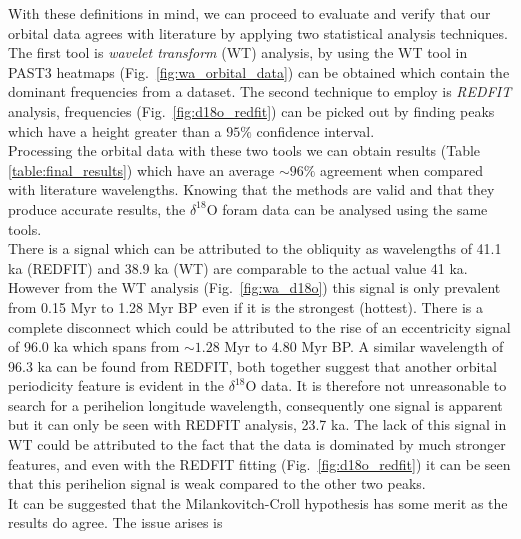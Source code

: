 \documentclass[12pt, onecolumn]{revtex4}    %
\begin{document}
With these definitions in mind, we can proceed to evaluate and verify that our orbital data agrees with literature by applying two statistical analysis techniques. The first tool is \textit{wavelet transform} (WT) analysis, by using the WT tool in PAST3 \cite{past3} heatmaps (Fig.~\ref{fig:wa_orbital_data}) can be obtained which contain the dominant frequencies from a dataset. The second technique to employ is \textit{REDFIT} analysis, frequencies (Fig.~\ref{fig:d18o_redfit}) can be picked out by finding peaks which have a height greater than a $95\%$ confidence interval. \\

Processing the orbital data with these two tools we can obtain results (Table \ref{table:final_results}) which have an average $\sim 96 \%$ agreement when compared with literature wavelengths. Knowing that the methods are valid and that they produce accurate results, the $\delta^{18}$O foram data can be analysed using the same tools. \\

There is a signal which can be attributed to the obliquity as wavelengths of 41.1 ka (REDFIT) and 38.9 ka (WT) are comparable to the actual value 41 ka. However from the WT analysis (Fig.~\ref{fig:wa_d18o}) this signal is only prevalent from 0.15 Myr to 1.28 Myr BP even if it is the strongest (hottest). There is a complete disconnect which could be attributed to the rise of an eccentricity signal of 96.0 ka which spans from $\sim 1.28$ Myr to 4.80 Myr BP. A similar wavelength of 96.3 ka can be found from REDFIT, both together suggest that another orbital periodicity feature is evident in the $\delta^{18}$O data. It is therefore not unreasonable to search for a perihelion longitude wavelength, consequently one signal is apparent but it can only be seen with REDFIT analysis, 23.7 ka. The lack of this signal in WT could be attributed to the fact that the data is dominated by much stronger features, and even with the REDFIT fitting (Fig.~\ref{fig:d18o_redfit}) it can be seen that this perihelion signal is weak compared to the other two peaks. \\

It can be suggested that the Milankovitch-Croll hypothesis has some merit as the results do agree. The issue arises is \\

\newpage




\end{document}
